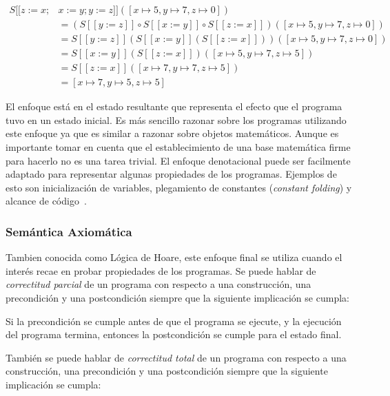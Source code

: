 \begin{align*}
S [\![ z:=x; & x:=y; y:=z ]\!]([x\mapsto5, y\mapsto7, z\mapsto0])\\
&= (S [\![ y:=z ]\!] \circ S [\![ x:=y ]\!] \circ S [\![ z:=x ]\!])([x\mapsto5, y\mapsto7, z\mapsto0])\\
&= S [\![ y:=z ]\!](S [\![ x:=y ]\!] (S [\![ z:=x ]\!]))([x\mapsto5, y\mapsto7, z\mapsto0])\\
&= S [\![ x:=y ]\!] (S [\![ z:=x ]\!])([x\mapsto5, y\mapsto7, z\mapsto5])\\
&= S [\![ z:=x ]\!]([x\mapsto7, y\mapsto7, z\mapsto5])\\
&= [x\mapsto7, y\mapsto5, z\mapsto5]
\end{align*}

El enfoque está en el estado resultante que representa el efecto que el programa tuvo en un estado inicial.
Es más sencillo razonar sobre los programas utilizando este enfoque ya que es similar a razonar sobre objetos matemáticos.
Aunque es importante tomar en cuenta que el establecimiento de una base matemática firme para hacerlo no es una tarea trivial.
El enfoque denotacional puede ser facilmente adaptado para representar algunas propiedades de los programas.
Ejemplos de esto son inicialización de variables, plegamiento de constantes (\textit{constant folding}) y alcance de código~\cite{nielson}.


\subsubsection*{Semántica Axiomática}

\begin{comment}
FIXME construcción
\end{comment}
Tambien conocida como Lógica de Hoare, este enfoque final se utiliza cuando el interés recae en probar propiedades de los programas.
Se puede hablar de \textit{correctitud parcial} de un programa con respecto a una construcción, una precondición y una postcondición siempre que la siguiente implicación se cumpla:

\begin{displayquote}
Si la precondición se cumple antes de que el programa se ejecute, y la ejecución del programa termina, entonces la postcondición se cumple para el estado final.
\end{displayquote}

También se puede hablar de \textit{correctitud total} de un programa con respecto a una construcción, una precondición y una postcondición siempre que la siguiente implicación se cumpla:

